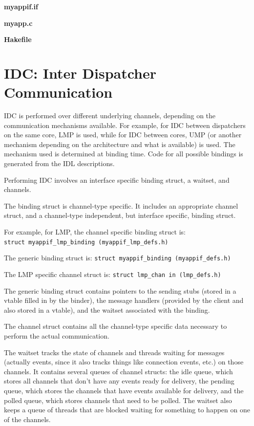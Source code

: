 \documentclass[a4paper,twoside]{report} %
\begin{document}
\textbf{myappif.if}
%


\textbf{myapp.c}
%


\textbf{Hakefile}
%



\chapter{IDC: Inter Dispatcher Communication}


IDC is performed over different underlying channels, depending on the
communication mechanisms available. For example, for IDC between dispatchers on
the same core, LMP is used, while for IDC between cores, UMP (or another
mechanism depending on the architecture and what is available) is used. The
mechanism used is determined at binding time. Code for all possible bindings is
generated from the IDL descriptions.

Performing IDC involves an interface specific binding struct, a waitset, and
channels.

The binding struct is channel-type specific. It includes an appropriate channel
struct, and a channel-type independent, but interface specific, binding struct.

For example, for LMP, the channel specific binding struct is: \\
\texttt{struct myappif\_lmp\_binding (myappif\_lmp\_defs.h)}

The generic binding struct is: \texttt{struct myappif\_binding (myappif\_defs.h)}

The LMP specific channel struct is: \texttt{struct lmp\_chan in (lmp\_defs.h)}

The generic binding struct contains pointers to the sending stubs (stored in a
vtable filled in by the binder), the message handlers (provided by the client
and also stored in a vtable), and the waitset associated with the binding.

The channel struct contains all the channel-type specific data necessary to
perform the actual communication.

The waitset tracks the state of channels and threads waiting for messages
(actually events, since it also tracks things like connection events, etc.) on
those channels. It contains several queues of channel structs: the idle queue,
which stores all channels that don't have any events ready for delivery, the
pending queue, which stores the channels that have events available for
delivery, and the polled queue, which stores channels that need to be
polled. The waitset also keeps a queue of threads that are blocked waiting for
something to happen on one of the channels.
\end{document}

